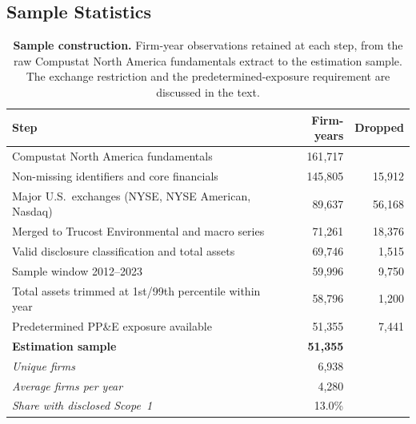 \documentclass[a4paper,12pt]{article}
\begin{document}
\subsection{Sample Statistics}

\begin{table}[htbp]
\centering
\small
\caption{\textbf{Sample construction.} Firm-year observations retained at each step, from the raw Compustat North America fundamentals extract to the estimation sample. The exchange restriction and the predetermined-exposure requirement are discussed in the text.}
\label{tab:sample_funnel}
\begin{tabular}{l r r}
\toprule
Step & Firm-years & Dropped \\
\midrule
Compustat North America fundamentals                          & 161{,}717 & \\
\quad Non-missing identifiers and core financials             & 145{,}805 & 15{,}912 \\
\quad Major U.S.\ exchanges (NYSE, NYSE American, Nasdaq)     &  89{,}637 & 56{,}168 \\
\quad Merged to Trucost Environmental and macro series        &  71{,}261 & 18{,}376 \\
\quad Valid disclosure classification and total assets        &  69{,}746 &  1{,}515 \\
\quad Sample window 2012--2023                                &  59{,}996 &  9{,}750 \\
\quad Total assets trimmed at 1st/99th percentile within year &  58{,}796 &  1{,}200 \\
\quad Predetermined PP\&E exposure available                  &  51{,}355 &  7{,}441 \\
\midrule
\textbf{Estimation sample}                                    & \textbf{51{,}355} & \\
\quad \emph{Unique firms}                                     & 6{,}938 & \\
\quad \emph{Average firms per year}                           & 4{,}280 & \\
\quad \emph{Share with disclosed Scope~1}                     & 13.0\% & \\
\bottomrule
\end{tabular}
\end{table}
\end{document}
